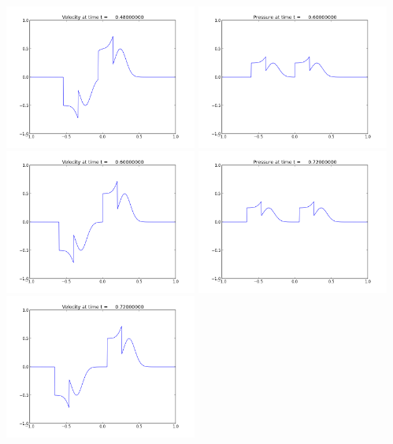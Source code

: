 \documentclass[11pt]{article}
\begin{document}
\includegraphics[width=0.475\textwidth]{frame0004fig2.png}
\vskip 10pt 
\includegraphics[width=0.475\textwidth]{frame0005fig1.png}
\includegraphics[width=0.475\textwidth]{frame0005fig2.png}
\vskip 10pt 
\includegraphics[width=0.475\textwidth]{frame0006fig1.png}
\includegraphics[width=0.475\textwidth]{frame0006fig2.png}
\end{document}
